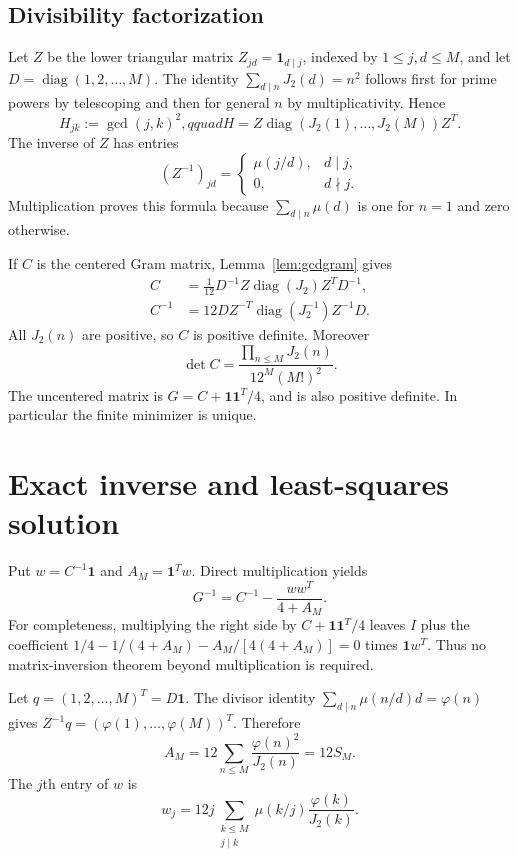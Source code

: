 \documentclass[11pt]{amsart}
\theoremstyle{definition}
\newcommand{\one}{\boldsymbol 1}\newcommand{\diag}{\operatorname{diag}}
\begin{document}
\subsection{Divisibility factorization}
Let $Z$ be the lower triangular matrix
$Z_{jd}=\boldsymbol1_{d\mid j}$, indexed by $1\le j,d\le M$,
and let $D=\diag(1,2,\ldots,M)$.
The identity $\sum_{d\mid n}J_2(d)=n^2$ follows first for prime
powers by telescoping and then for general $n$ by multiplicativity.
Hence
\begin{equation}\label{eq:factor}
 H_{jk}:=\gcd(j,k)^2,qquad
 H=Z\diag(J_2(1),\ldots,J_2(M))Z^T.
\end{equation}
The inverse of $Z$ has entries
\[
 (Z^{-1})_{jd}=\begin{cases}\mu(j/d),&d\mid j,\\0,&d\nmid j.\end{cases}
\]
Multiplication proves this formula because $\sum_{d\mid n}\mu(d)$
is one for $n=1$ and zero otherwise.

If $C$ is the centered Gram matrix, Lemma~\ref{lem:gcdgram} gives
\begin{align}
 C&=\frac1{12}D^{-1}Z\diag(J_2)Z^TD^{-1},\label{eq:C}\\
 C^{-1}&=12D Z^{-T}\diag(J_2^{-1})Z^{-1}D.\label{eq:Cinverse}
\end{align}
All $J_2(n)$ are positive, so $C$ is positive definite. Moreover
\begin{equation}\label{eq:detC}
 \det C=\frac{\prod_{n\le M}J_2(n)}{12^M(M!)^2}.
\end{equation}
The uncentered matrix is $G=C+\one\one^T/4$, and is also positive
definite. In particular the finite minimizer is unique.

\section{Exact inverse and least-squares solution}
Put $w=C^{-1}\one$ and $A_M=\one^Tw$. Direct multiplication yields
\begin{equation}\label{eq:rankone}
 G^{-1}=C^{-1}-\frac{ww^T}{4+A_M}.
\end{equation}
For completeness, multiplying the right side by $C+\one\one^T/4$
leaves $I$ plus the coefficient
$1/4-1/(4+A_M)-A_M/[4(4+A_M)]=0$ times $\one w^T$.
Thus no matrix-inversion theorem beyond multiplication is required.

Let $q=(1,2,\ldots,M)^T=D\one$. The divisor identity
$\sum_{d\mid n}\mu(n/d)d=\varphi(n)$ gives
$Z^{-1}q=(\varphi(1),\ldots,\varphi(M))^T$. Therefore
\begin{equation}\label{eq:A}
 A_M=12\sum_{n\le M}\frac{\varphi(n)^2}{J_2(n)}=12S_M.
\end{equation}
The $j$th entry of $w$ is
\begin{equation}\label{eq:w}
 w_j=12j\sum_{\substack{k\le M\\j\mid k}}
         \mu(k/j)\frac{\varphi(k)}{J_2(k)}.
\end{equation}
\end{document}
